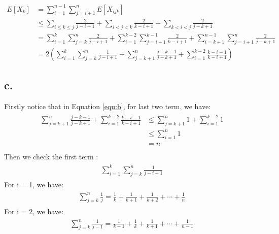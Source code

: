 \documentclass[oneside]{homework} %
\begin{document}
\begin{equation} 
  \begin{aligned}
	E[X_k] &= \sum_{i=1}^{n-1}\sum_{j=i+1}^{n}E[X_{ijk}] \\
   & \leq \sum_{i \leq k \leq j} \frac{2}{j - i + 1} + \sum_{i<j<k} \frac{2}{k - i + 1} + \sum_{k<i<j} \frac{2}{j - k + 1} \\
	     & = \sum_{i = 1}^k \sum_{j = k}^n \frac{2}{j - i + 1} + \sum_{i = 1}^{k - 2} \sum_{j = i + 1}^{k - 1} \frac{2}{k - i + 1} + \sum_{i = k + 1}^{n - 1} \sum_{j = i + 1}^{n} \frac{2}{j - k + 1} \\
	  & = 2(\sum_{i = 1}^k \sum_{j = k}^n \frac{1}{j - i + 1} + \sum_{j = k + 1}^{n} \frac{j - k - 1}{j - k + 1} + \sum_{i = 1}^{k - 2} \frac{k - i - 1}{k - i + 1})
  \end{aligned}
  \label{equ:b}
\end{equation}

\subsection*{c.}
Firstly notice that in Equation \ref{equ:b}, for last two term, we have:
\begin{eqnarray}
  \begin{split}
	\sum_{j = k + 1}^{n} \frac{j - k - 1}{j - k + 1} + \sum_{i = 1}^{k - 2} \frac{k - i - 1}{k - i + 1} &\leq \sum_{j = k + 1}^{n}1 + \sum_{i = 1}^{k - 2}1 \\
	 &\leq \sum_{i = 1}^{n}1 \\
	 &= n \\
  \end{split}
\end{eqnarray}
Then we check the first term :
\begin{eqnarray}
  \begin{split}
	\sum_{i = 1}^k \sum_{j = k}^n \frac{1}{j - i + 1}
  \end{split}
\end{eqnarray}
For  i = 1, we have:
\begin{eqnarray}
  \begin{split}
	\sum_{j = k}^n \frac{1}{j} = \frac{1}{k} + \frac{1}{k+1} + \frac{1}{k+2} + \cdots + \frac{1}{n}
  \end{split}
\end{eqnarray}
For  i = 2, we have:
\begin{eqnarray}
  \begin{split}
	\sum_{j = k}^n \frac{1}{j-1} = \frac{1}{k-1} + \frac{1}{k} + \frac{1}{k+1} + \cdots + \frac{1}{n-1}
  \end{split}
\end{eqnarray}
\end{document}
